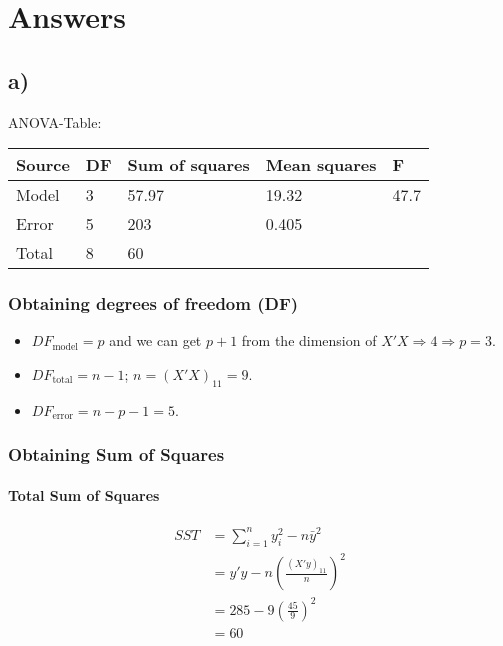 \documentclass[]{article}
\providecommand{\tightlist}{%
  \setlength{\itemsep}{0pt}\setlength{\parskip}{0pt}}
\let\oldparagraph\paragraph
\renewcommand{\paragraph}[1]{\oldparagraph{#1}\mbox{}}
\begin{document}
\section{Answers}\label{answers}

\subsection{a)}\label{a}

ANOVA-Table:

\begin{longtable}[c]{@{}lllll@{}}
\toprule
Source & DF & Sum of squares & Mean squares & F\tabularnewline
\midrule
\endhead
Model & 3 & 57.97 & 19.32 & 47.7\tabularnewline
Error & 5 & 203 & 0.405 &\tabularnewline
Total & 8 & 60 & &\tabularnewline
\bottomrule
\end{longtable}

\subsubsection{Obtaining degrees of freedom
(DF)}\label{obtaining-degrees-of-freedom-df}

\begin{itemize}
\tightlist
\item
  \(DF_{\text{model}} = p\) and we can get \(p+1\) from the dimension of
  \(X'X \Rightarrow 4 \Rightarrow p = 3\).
\item
  \(DF_{\text{total}} = n - 1\); \(n = (X'X)_{11} = 9\).
\item
  \(DF_{\text{error}} = n - p - 1 = 5\).
\end{itemize}

\subsubsection{Obtaining Sum of Squares}\label{obtaining-sum-of-squares}

\paragraph{Total Sum of Squares}\label{total-sum-of-squares}

\[
\begin{aligned}
SST &= \sum_{i = 1}^n y_i^2 - n\bar{y}^2\\
 &= y'y - n\left( \frac{(X'y)_{11}}{n} \right)^2\\
 &= 285 - 9\left( \frac{45}{9} \right)^2\\
 &= 60
\end{aligned}
\]
\end{document}
